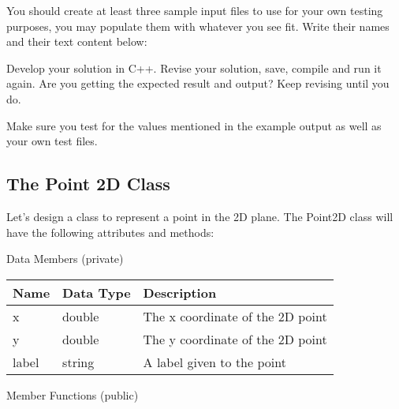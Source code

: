 \begin{multipart}
You should create at least three sample input files to use for your own testing purposes, you may populate them with whatever you see fit. Write their names and their text content below:  
\end{multipart}

\vspace{3cm}

\begin{multipart}
Develop your solution in C++. Revise your solution, save, compile and run it again. Are you getting the expected result and output? Keep revising until you do.

Make sure you test for the values mentioned in the example output as well as your own test files.
\end{multipart}

\newpage


\subsection{The Point 2D Class}
Let’s design a class to represent a point in the 2D plane. The Point2D class will have the following attributes and methods:


Data Members (private)

\begin{table}[H]
    \centering
    \begin{tabular}{|p{1.5in}|p{1.5in}|p{1.5in}|} 
        \hline
        Name & Data Type & Description  \\ 
        \hline
        x & double & The x coordinate of the 2D point \\ 
        \hline
        y & double & The y coordinate of the 2D point \\ 
        \hline
        label & string & A label given to the point \\ 
        \hline
    \end{tabular}
\end{table}

Member Functions (public)

